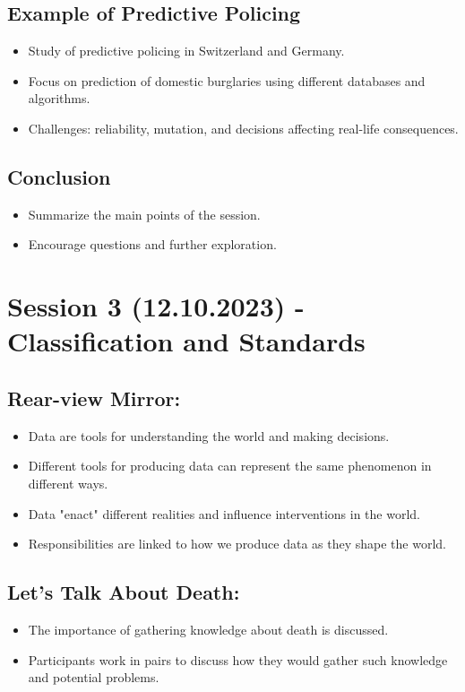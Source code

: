 \documentclass{article}
\begin{document}
\subsection*{Example of Predictive Policing}
\begin{itemize}
    \item Study of predictive policing in Switzerland and Germany.
    \item Focus on prediction of domestic burglaries using different databases and algorithms.
    \item Challenges: reliability, mutation, and decisions affecting real-life consequences.
\end{itemize}

\subsection*{Conclusion}
\begin{itemize}
    \item Summarize the main points of the session.
    \item Encourage questions and further exploration.
\end{itemize}


\section*{Session 3 (12.10.2023) - Classification and Standards}

\subsection*{Rear-view Mirror:}
\begin{itemize}
  \item Data are tools for understanding the world and making decisions.
  \item Different tools for producing data can represent the same phenomenon in different ways.
  \item Data "enact" different realities and influence interventions in the world.
  \item Responsibilities are linked to how we produce data as they shape the world.
\end{itemize}

\subsection*{Let's Talk About Death:}
\begin{itemize}
  \item The importance of gathering knowledge about death is discussed.
  \item Participants work in pairs to discuss how they would gather such knowledge and potential problems.
\end{itemize}
\end{document}
